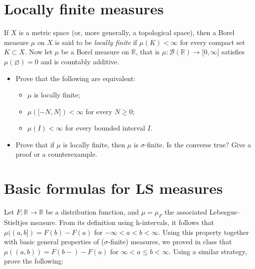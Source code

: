 \documentclass{qlnotes-export}
\begin{document}
\section{Locally finite measures}\label{locally-finite-measures}

If \(X\) is a metric space (or, more generally, a topological space), then a Borel measure \(\mu\) on \(X\) is said to be \emph{locally finite} if \(\mu(K) < \infty\) for every compact set \(K \subset X\). Now let \(\mu\) be a Borel measure on \(\mathbb{R}\), that is \(\mu:\mathcal{B}({\mathbb{R}})\rightarrow\lbrack 0,\infty\rbrack\) satisfies \(\mu(\varnothing) = 0\) and is countably additive.

\begin{itemize}
\item
  Prove that the following are equivalent:

  \begin{itemize}
  \item
    \(\mu\) is locally finite;
  \item
    \(\mu(\lbrack - N,N\rbrack) < \infty\) for every \(N \geq 0\);
  \item
    \(\mu(I) < \infty\) for every bounded interval \(I\).
  \end{itemize}
\item
  Prove that if \(\mu\) is locally finite, then \(\mu\) is \(\sigma\)-finite. Is the converse true? Give a proof or a counterexample.
\end{itemize}

\section{Basic formulas for LS measures}\label{basic-formulas-for-ls-measures}

Let \(F:{\mathbb{R}}\rightarrow{\mathbb{R}}\) be a distribution function, and \(\mu = \mu_{F}\) the associated Lebesgue--Stieltjes measure. From its definition using h-intervals, it follows that \(\mu((a,b\rbrack) = F(b) - F(a)\) for \(- \infty < a < b < \infty\). Using this property together with basic general properties of (\(\sigma\)-finite) measures, we proved in class that \(\mu((a,b)) = F(b - ) - F(a)\) for \(\infty < a \leq b < \infty\). Using a similar strategy, prove the following:
\end{document}
